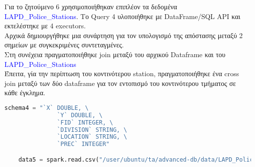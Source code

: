 \documentclass{article}
\begin{document}
Για το ζητούμενο 6 χρησιμοποιήθηκαν επιπλέον τα δεδομένα \textcolor{blue}{LAPD\_Police\_Stations}. 
Το Query 4 υλοποιήθηκε με DataFrame/SQL API και εκτελέστηκε με 4 executors.  \\
Αρχικά δημιουργήθηκε μια συνάρτηση για τον υπολογισμό της απόστασης μεταξύ 2 σημείων με 
συγκεκριμένες συντεταγμένες. \\
Στη συνέχεια πραγματοποιήθηκε join μεταξύ του αρχικού Dataframe και του \textcolor{blue}{LAPD\_Police\_Stations}\\
Έπειτα, γία την περίπτωση του κοντινότερου station, πραγματοποιήθηκε ένα cross join μεταξύ των δύο dataframe
για τον εντοπισμό του κοντινότερου τμήματος σε κάθε έγκλημα. 

\begin{lstlisting}[language = Python]
    schema4 = "`X` DOUBLE, \
               `Y` DOUBLE, \
               `FID` INTEGER, \
               `DIVISION` STRING, \
               `LOCATION` STRING, \
               `PREC` INTEGER"

    data5 = spark.read.csv("/user/ubuntu/ta/advanced-db/data/LAPD_Police_Stations.csv", header=True, schema=schema4)


\end{lstlisting}
    
\end{document}
